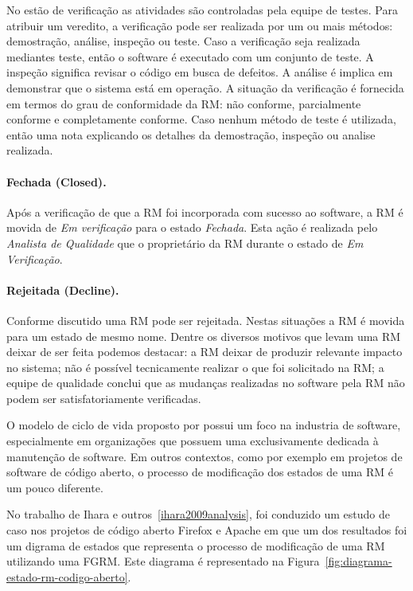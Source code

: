 No estão de verificação as atividades são controladas pela equipe de testes.
Para atribuir um veredito, a verificação pode ser realizada por um ou mais
métodos: demostração, análise, inspeção ou teste. Caso a verificação seja
realizada mediantes teste, então o software é executado com um conjunto de
teste. A inspeção significa revisar o código em busca de defeitos. A análise é
implica em demonstrar que o sistema está em operação. A situação da verificação
é fornecida em termos do grau de conformidade da RM: não conforme, parcialmente
conforme e completamente conforme. Caso nenhum método de teste é utilizada,
então uma nota explicando os detalhes da demostração, inspeção ou analise
realizada.

\paragraph{Fechada (Closed).}
\label{par:fechada}

Após a verificação de que a RM foi incorporada com sucesso ao software, a RM é
movida de \textit{Em verificação} para o estado \textit{Fechada}. Esta ação é
realizada pelo \textit{Analista de Qualidade} que o proprietário da RM durante o
estado de \textit{Em Verificação}.

\paragraph{Rejeitada (Decline).}
\label{par:rejeitada}
Conforme discutido uma RM pode ser rejeitada. Nestas situações a RM é movida
para um estado de mesmo nome. Dentre os diversos motivos que levam uma RM deixar
de ser feita podemos destacar: a RM deixar de produzir relevante impacto no
sistema; não é possível tecnicamente realizar o que foi solicitado na RM; a
equipe de qualidade conclui que as mudanças realizadas no software pela RM não
podem ser satisfatoriamente verificadas.
\todoend

O modelo de ciclo de vida proposto por possui um foco na industria de software,
especialmente em organizações que possuem uma exclusivamente dedicada à
manutenção de software. Em outros contextos, como por exemplo em projetos de
software de código aberto, o processo de modificação dos estados de uma RM é um
pouco diferente.

No trabalho de Ihara e outros~\ref{ihara2009analysis}, foi conduzido um estudo
de caso nos projetos de código aberto Firefox e Apache em que um dos resultados
foi um digrama de estados que representa o processo de modificação de uma RM
utilizando uma FGRM. Este diagrama é representado na
Figura~\ref{fig:diagrama-estado-rm-codigo-aberto}.

